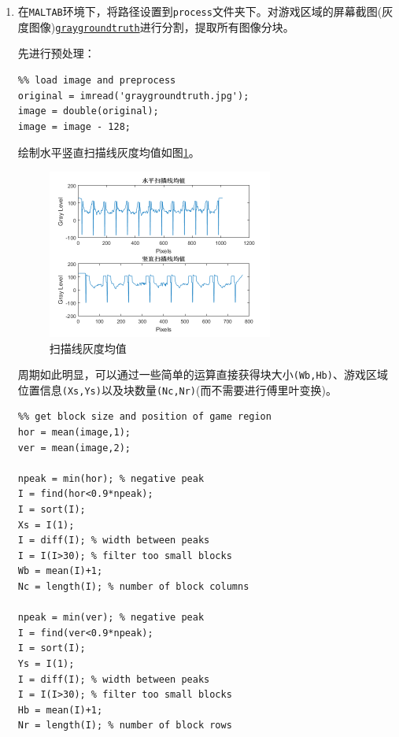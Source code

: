 \documentclass{article}
\numberwithin{figure}{section}
\numberwithin{table}{section}
\numberwithin{listing}{section}
\numberwithin{equation}{section}
\begin{document}
        \begin{enumerate}
            \item 在\texttt{MALTAB}环境下，将路径设置到\texttt{process}文件夹下。对游戏区域的屏幕截图(灰度图像)\href{../process/graygroundtruth.jpg}{\texttt{graygroundtruth}}进行分割，提取所有图像分块。

                先进行预处理：

                \begin{verbatim}
%% load image and preprocess
original = imread('graygroundtruth.jpg');
image = double(original);
image = image - 128;
                \end{verbatim}

                绘制水平竖直扫描线灰度均值如图\ref{fig:gray_mean}。

                \begin{figure}[H]
                    \centering
                    \includegraphics[width=0.7\textwidth]{gray_mean}
                    \caption{扫描线灰度均值}
                    \label{fig:gray_mean}
                \end{figure}

                周期如此明显，可以通过一些简单的运算直接获得块大小\texttt{(Wb,Hb)}、游戏区域位置信息\texttt{(Xs,Ys)}以及块数量\texttt{(Nc,Nr)}(而不需要进行傅里叶变换)。

                \begin{verbatim}
%% get block size and position of game region
hor = mean(image,1);
ver = mean(image,2);

npeak = min(hor); % negative peak
I = find(hor<0.9*npeak);
I = sort(I);
Xs = I(1);
I = diff(I); % width between peaks
I = I(I>30); % filter too small blocks
Wb = mean(I)+1;
Nc = length(I); % number of block columns

npeak = min(ver); % negative peak
I = find(ver<0.9*npeak);
I = sort(I);
Ys = I(1);
I = diff(I); % width between peaks
I = I(I>30); % filter too small blocks
Hb = mean(I)+1;
Nr = length(I); % number of block rows
                \end{verbatim}
                \begingroup
                \endgroup


\end{enumerate}
\end{document}
